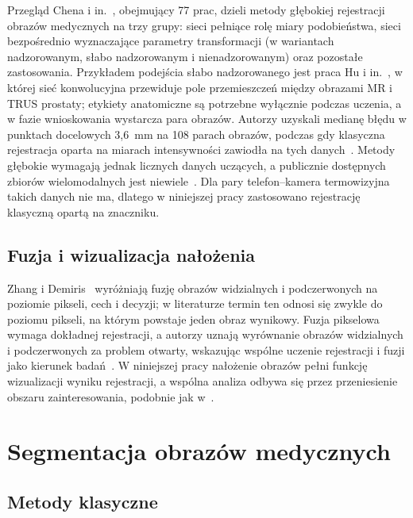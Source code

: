 Przegląd Chena i in.~\cite{deep-learning-in-registration}, obejmujący 77 prac, dzieli metody głębokiej rejestracji obrazów medycznych na trzy grupy: sieci pełniące rolę miary podobieństwa, sieci bezpośrednio wyznaczające parametry transformacji (w wariantach nadzorowanym, słabo nadzorowanym i nienadzorowanym) oraz pozostałe zastosowania. Przykładem podejścia słabo nadzorowanego jest praca Hu i in.~\cite{neural-networks}, w której sieć konwolucyjna przewiduje pole przemieszczeń między obrazami MR i TRUS prostaty; etykiety anatomiczne są potrzebne wyłącznie podczas uczenia, a w fazie wnioskowania wystarcza para obrazów. Autorzy uzyskali medianę błędu w punktach docelowych 3,6~mm na 108 parach obrazów, podczas gdy klasyczna rejestracja oparta na miarach intensywności zawiodła na tych danych~\cite{neural-networks}. Metody głębokie wymagają jednak licznych danych uczących, a publicznie dostępnych zbiorów wielomodalnych jest niewiele~\cite{deep-learning-in-registration}. Dla pary telefon--kamera termowizyjna takich danych nie ma, dlatego w niniejszej pracy zastosowano rejestrację klasyczną opartą na znaczniku.

\subsection{Fuzja i wizualizacja nałożenia}
\label{sec:fuzja}

Zhang i Demiris~\cite{deep-learning} wyróżniają fuzję obrazów widzialnych i podczerwonych na poziomie pikseli, cech i decyzji; w literaturze termin ten odnosi się zwykle do poziomu pikseli, na którym powstaje jeden obraz wynikowy. Fuzja pikselowa wymaga dokładnej rejestracji, a autorzy uznają wyrównanie obrazów widzialnych i podczerwonych za problem otwarty, wskazując wspólne uczenie rejestracji i fuzji jako kierunek badań~\cite{deep-learning}. W niniejszej pracy nałożenie obrazów pełni funkcję wizualizacji wyniku rejestracji, a wspólna analiza odbywa się przez przeniesienie obszaru zainteresowania, podobnie jak w~\cite{non-contact-breathing-monitoring}.

\section{Segmentacja obrazów medycznych}
\label{sec:segmentacja}

\subsection{Metody klasyczne}
\label{sec:segmentacja-klasyczna}


